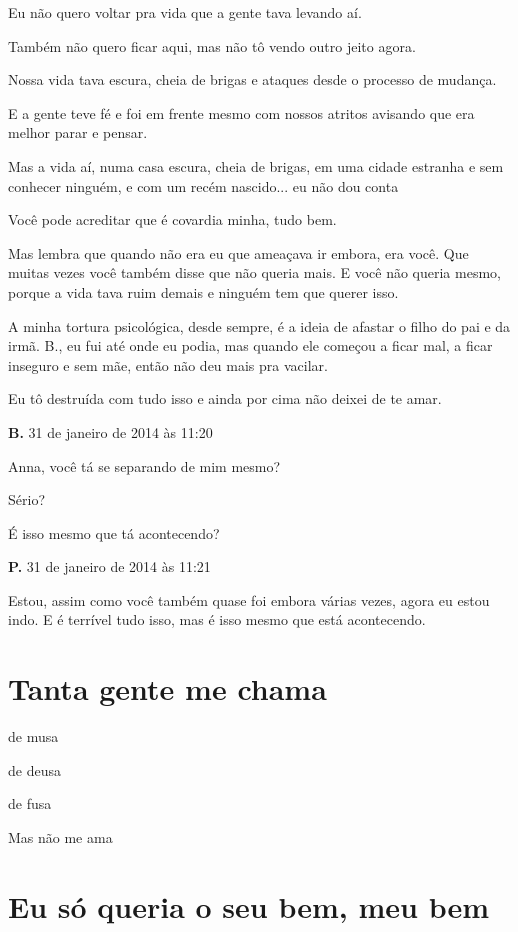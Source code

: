 {{{Eu não quero voltar pra vida que a gente tava levando aí.

Também não quero ficar aqui, mas não tô vendo outro jeito agora.

Nossa vida tava escura, cheia de brigas e ataques desde o processo de
mudança.

E a gente teve fé e foi em frente mesmo com nossos atritos avisando que
era melhor parar e pensar.

Mas a vida aí, numa casa escura, cheia de brigas, em uma cidade estranha
e sem conhecer ninguém, e com um recém nascido... eu não dou conta

Você pode acreditar que é covardia minha, tudo bem.

Mas lembra que quando não era eu que ameaçava ir embora, era você. Que
muitas vezes você também disse que não queria mais. E você não queria
mesmo, porque a vida tava ruim demais e ninguém tem que querer isso.

A minha tortura psicológica, desde sempre, é a ideia de afastar o filho
do pai e da irmã. B., eu fui até onde eu podia, mas quando ele começou a
ficar mal, a ficar inseguro e sem mãe, então não deu mais pra vacilar.

Eu tô destruída com tudo isso e ainda por cima não deixei de te amar.

\textbf{B.} 31 de janeiro de 2014 às 11:20

Anna, você tá se separando de mim mesmo?

Sério?

É isso mesmo que tá acontecendo?

\textbf{P.} 31 de janeiro de 2014 às 11:21

Estou, assim como você também quase foi embora várias vezes, agora eu
estou indo. E é terrível tudo isso, mas é isso mesmo que está
acontecendo.
}

\chapter{Tanta gente me chama}

{\parindent0pt
de musa

de deusa

de fusa

Mas não me ama
}


\chapter{Eu só queria o seu bem, meu bem}

}}
